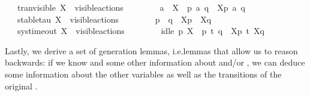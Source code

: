 \begin{isabellebody}
\ \ {\isacharbar}{\kern0pt}\ tran{\isacharunderscore}{\kern0pt}visible{\isacharcolon}{\kern0pt}\ {\isacartoucheopen}X\ {\isasymsubseteq}\ visible{\isacharunderscore}{\kern0pt}actions\ {\isasymLongrightarrow}\ \isanewline
\ \ \ \ \ \ a\ {\isasymin}\ X\ {\isasymLongrightarrow}\ p\ {\isasymlongmapsto}a\ q\ {\isasymLongrightarrow}\ {\isasymtheta}{\isacharbrackleft}{\kern0pt}X{\isacharbrackright}{\kern0pt}{\isacharparenleft}{\kern0pt}p{\isacharparenright}{\kern0pt}\ {\isasymlongmapsto}\isactrlsup {\isasymtheta}a\ {\isasymtheta}{\isacharparenleft}{\kern0pt}q{\isacharparenright}{\kern0pt}{\isacartoucheclose}\isanewline
\ \ {\isacharbar}{\kern0pt}\ stable{\isacharunderscore}{\kern0pt}tau{\isacharcolon}{\kern0pt}\ {\isacartoucheopen}X\ {\isasymsubseteq}\ visible{\isacharunderscore}{\kern0pt}actions\ {\isasymLongrightarrow}\ \isanewline
\ \ \ \ \ \ p\ {\isasymlongmapsto}{\isasymtau}\ q\ {\isasymLongrightarrow}\ {\isasymtheta}{\isacharbrackleft}{\kern0pt}X{\isacharbrackright}{\kern0pt}{\isacharparenleft}{\kern0pt}p{\isacharparenright}{\kern0pt}\ {\isasymlongmapsto}\isactrlsup {\isasymtheta}{\isasymtau}\ {\isasymtheta}{\isacharbrackleft}{\kern0pt}X{\isacharbrackright}{\kern0pt}{\isacharparenleft}{\kern0pt}q{\isacharparenright}{\kern0pt}{\isacartoucheclose}\isanewline
\ \ {\isacharbar}{\kern0pt}\ sys{\isacharunderscore}{\kern0pt}timeout{\isacharcolon}{\kern0pt}\ {\isacartoucheopen}X\ {\isasymsubseteq}\ visible{\isacharunderscore}{\kern0pt}actions\ {\isasymLongrightarrow}\ \isanewline
\ \ \ \ \ \ idle\ p\ X\ {\isasymLongrightarrow}\ p\ {\isasymlongmapsto}t\ q\ {\isasymLongrightarrow}\ {\isasymtheta}{\isacharbrackleft}{\kern0pt}X{\isacharbrackright}{\kern0pt}{\isacharparenleft}{\kern0pt}p{\isacharparenright}{\kern0pt}\ {\isasymlongmapsto}\isactrlsup {\isasymtheta}t\ {\isasymtheta}{\isacharbrackleft}{\kern0pt}X{\isacharbrackright}{\kern0pt}{\isacharparenleft}{\kern0pt}q{\isacharparenright}{\kern0pt}{\isacartoucheclose}%
\begin{isamarkuptext}%
\pagebreak%
\end{isamarkuptext}\isamarkuptrue%
%
\isadelimdocument
%
\endisadelimdocument
%
\isatagdocument
%
\isamarkuptrue%
%
\endisatagdocument
{\isafolddocument}%
%
\isadelimdocument
%
\endisadelimdocument
%
\begin{isamarkuptext}%
Lastly, we derive a set of generation lemmas, i.e.\@ lemmas that allow us to reason backwards: if we know  and some other information about  and/or \isa{{\isasymalpha}}, we can deduce some information about the other variables as well as the transitions of the original \LTSt{}.%

\end{isamarkuptext}
\end{isabellebody}

